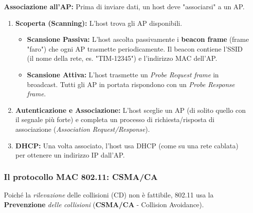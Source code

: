 \textbf{Associazione all'AP:}
Prima di inviare dati, un host deve "associarsi" a un AP.
\begin{enumerate}
    \item \textbf{Scoperta (Scanning):} L'host trova gli AP disponibili.
        \begin{itemize}
            \item \textbf{Scansione Passiva:} L'host ascolta passivamente i \textbf{beacon frame} (frame "faro") che ogni AP trasmette periodicamente. Il beacon contiene l'SSID (il nome della rete, es. "TIM-12345") e l'indirizzo MAC dell'AP.
            \item \textbf{Scansione Attiva:} L'host trasmette un \textit{Probe Request frame} in broadcast. Tutti gli AP in portata rispondono con un \textit{Probe Response frame}.
        \end{itemize}
    \item \textbf{Autenticazione e Associazione:} L'host sceglie un AP (di solito quello con il segnale più forte) e completa un processo di richiesta/risposta di associazione (\textit{Association Request/Response}).
    \item \textbf{DHCP:} Una volta associato, l'host usa DHCP (come su una rete cablata) per ottenere un indirizzo IP dall'AP.
\end{enumerate}

\subsubsection{Il protocollo MAC 802.11: CSMA/CA}
Poiché la \textit{rilevazione} delle collisioni (CD) non è fattibile, 802.11 usa la \textbf{Prevenzione} \textit{delle collisioni} (\textbf{CSMA/CA} - Collision Avoidance).

